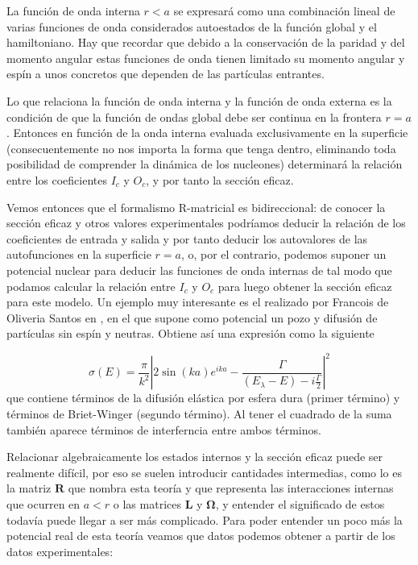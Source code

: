 \documentclass[fleqn,11pt]{SelfArx} %
\newcommand{\Rn}{\mathbf{R}}
\newcommand{\Ln}{\mathbf{L}}
\newcommand{\Omegan}{\boldsymbol{\Omega}}
\begin{document}
La función de onda interna $r<a$ se expresará como una combinación lineal de varias funciones de onda considerados autoestados de la función global y el hamiltoniano. Hay que recordar que debido a la conservación de la paridad y del momento angular estas funciones de onda tienen limitado su momento angular y espín a unos concretos que dependen de las partículas entrantes.  

Lo que relaciona la función de onda interna y la función de onda externa es la condición de que la función de ondas global debe ser continua en la frontera $r=a$. Entonces en función de la onda interna evaluada exclusivamente en la superficie (consecuentemente no nos importa la forma que tenga dentro, eliminando toda posibilidad de comprender la dinámica de los nucleones) determinará la relación entre los coeficientes $I_c$ y $O_c$, y por tanto la sección eficaz. 

Vemos entonces que el formalismo R-matricial es bidireccional: de conocer la sección eficaz y otros valores experimentales podríamos deducir la relación de los coeficientes de entrada y salida y por tanto deducir los autovalores de las autofunciones en la superficie $r=a$, o, por el contrario, podemos suponer un potencial nuclear para deducir las funciones de onda internas de tal modo que podamos calcular la relación entre $I_c$ y $O_c$ para luego obtener la sección eficaz para este modelo. Un ejemplo muy interesante es el realizado por Francois de Oliveria Santos en \cite{Ressonant-Scattering-Elastic}, en el que supone como potencial un pozo y difusión de partículas sin espín y neutras. Obtiene así una expresión como la siguiente

\begin{equation}
	\sigma (E) = \frac{\pi}{k^2} \left| 2 \sin (ka)e^{ika} - \frac{\Gamma}{(E_\lambda - E) - i \frac{\Gamma}{2}} \right|^2
\end{equation}
que contiene términos de la difusión elástica por esfera dura (primer término) y términos de Briet-Winger (segundo término). Al tener el cuadrado de la suma también aparece términos de interferncia entre ambos términos.

Relacionar algebraicamente los estados internos y la sección eficaz puede ser realmente difícil, por eso se suelen introducir cantidades intermedias, como lo es la matriz $\Rn$ que nombra esta teoría y que representa las interacciones internas que ocurren en $a<r$ o las matrices $\Ln$ y $\Omegan$, y entender el significado de estos todavía puede llegar a ser más complicado. Para poder entender un poco más la potencial real de esta teoría veamos que datos podemos obtener a partir de los datos experimentales:
\end{document}
